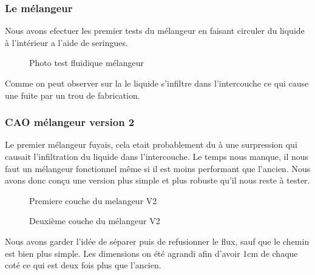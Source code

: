 \documentclass[a4paper, 11pt]{article}
\begin{document}
\subsubsection{Le mélangeur}
Nous avons efectuer les premier tests du mélangeur en faisant circuler du liquide à l'intérieur
a l'aide de seringues.
\begin{figure}[H]
    \centering
    \caption{Photo test fluidique mélangeur}
    \label{fig:fuite_melangeurV1}
\end{figure}
Comme on peut observer sur la \label{fig:fuite_melangeur} le liquide s'infiltre dans l'intercouche ce qui cause une fuite
par un trou de fabrication.
\subsubsection{CAO mélangeur version 2}
Le premier mélangeur fuyais, cela etait probablement du à une surpression qui causait
l'infiltration du liquide dans l'intercouche.
Le temps nous manque, il nous faut un mélangeur fonctionnel même si il est moins performant que l'ancien.
Nous avons donc conçu une version plus simple et plus robuste qu'il nous reste à tester.
\begin{multicols}{2}
    \begin{figure}[H]
        \centering
        \caption{Premiere couche du melangeur V2}
        \label{fig: CAO_melangeur_V2_couche1}
    \end{figure}
    \begin{figure}[H]
        \centering
        \caption{Deuxième couche du mélangeur V2}
        \label{fig:CAO_melangeur_V2_couche2}
    \end{figure}
\end{multicols}
Nous avons garder l'idée de séparer puis de refusionner le flux, sauf que le chemin est bien plus simple.
Les dimensions on été agrandi afin d'avoir 1cm de chaque coté ce qui est deux fois plus que l'ancien.
\end{document}
